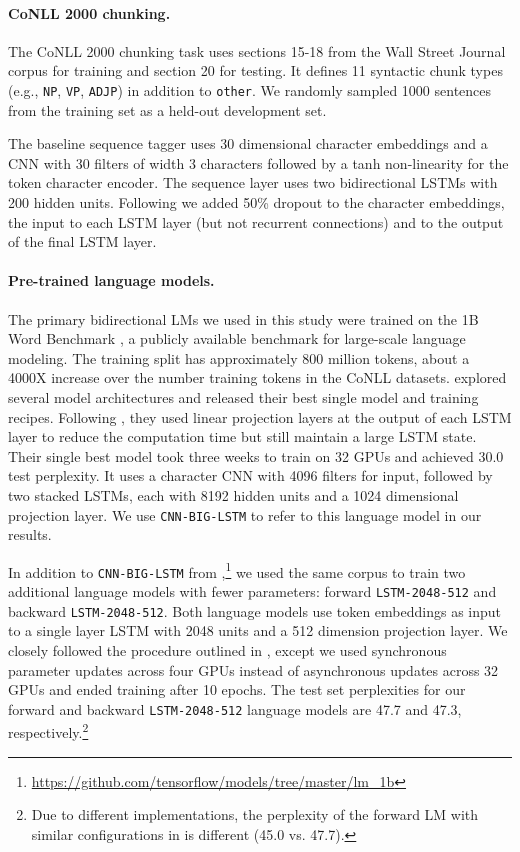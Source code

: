 \documentclass[11pt,a4paper]{article}
\begin{document}
\paragraph{CoNLL 2000 chunking.}
The CoNLL 2000 chunking task uses sections 15-18 from the Wall Street Journal corpus for training and
section 20 for testing.  It defines 11 syntactic chunk types (e.g., \texttt{NP}, \texttt{VP}, \texttt{ADJP})
in addition to \texttt{other}.  
We randomly sampled 1000 sentences from the training
set as a held-out development set.

The baseline sequence tagger uses 30 dimensional character embeddings and a CNN with 30 filters of width 3 characters followed
by a tanh non-linearity for the token character encoder.
The sequence layer uses two bidirectional LSTMs with 200 hidden units.  Following \citet{Ma2016EndtoendSL} we
added 50\% dropout to the character embeddings, the input to each LSTM layer (but not recurrent connections)
and to the output of the final LSTM layer.

\paragraph{Pre-trained language models.}
\label{sec:language_models}

The primary bidirectional LMs we used in this study were trained
on the 1B Word Benchmark \cite{Chelba2014OneBW}, a publicly available benchmark for large-scale language modeling.
The training split has approximately 800 million tokens, about a 4000X increase over the number training tokens in the CoNLL datasets.  
\citet{Jzefowicz2016ExploringTL} explored several model architectures and released their best single model and training recipes.
Following \citet{Sak2014LongSM}, they used linear projection layers at the output of each LSTM layer to reduce the computation time but still maintain a large LSTM state.
Their single best model took three weeks to train on 32 GPUs and achieved 30.0 test perplexity.  It uses a character CNN with 4096 filters for input, followed by two stacked LSTMs, each with 8192 hidden units and a 1024 dimensional projection layer.
We use \texttt{CNN-BIG-LSTM} to refer to this language model in our results.

In addition to \texttt{CNN-BIG-LSTM} from \citet{Jzefowicz2016ExploringTL},\footnote{\url{https://github.com/tensorflow/models/tree/master/lm_1b}} we used the same corpus to train two additional language models with fewer parameters: forward \texttt{LSTM-2048-512} and backward \texttt{LSTM-2048-512}.
Both language models use token embeddings as input to
a single layer LSTM with 2048 units and a 512 dimension projection layer.  
We closely followed the procedure outlined in \citet{Jzefowicz2016ExploringTL}, except we used synchronous parameter updates across four GPUs instead of asynchronous updates across 32 GPUs and ended training after 10 epochs.
The test set perplexities for our forward and backward \texttt{LSTM-2048-512} language models are 47.7 and 47.3, respectively.\footnote{Due to different implementations, the perplexity of the forward LM with similar configurations in \citet{Jzefowicz2016ExploringTL} is different (45.0 vs. 47.7).}
\end{document}
